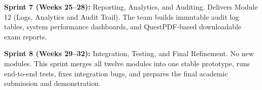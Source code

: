 \textbf{Sprint 7 (Weeks 25--28):} Reporting, Analytics, and Auditing. Delivers Module 12 (Logs, Analytics and Audit Trail). The team builds immutable audit log tables, system performance dashboards, and QuestPDF-based downloadable exam reports.

\textbf{Sprint 8 (Weeks 29--32):} Integration, Testing, and Final Refinement. No new modules. This sprint merges all twelve modules into one stable prototype, runs end-to-end tests, fixes integration bugs, and prepares the final academic submission and demonstration.

